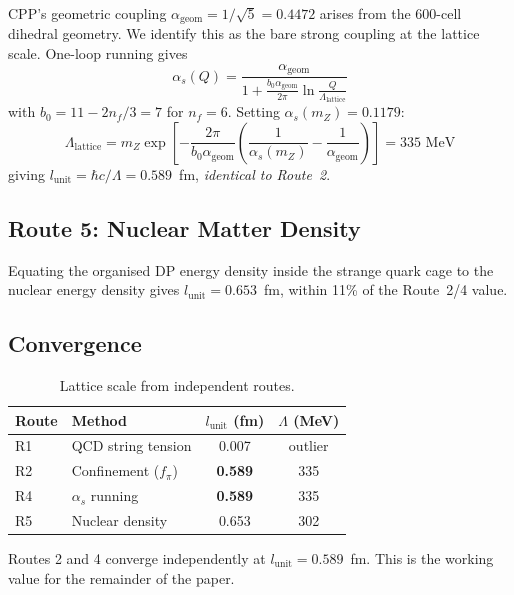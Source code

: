 \documentclass[12pt,a4paper]{article}
\begin{document}
CPP's geometric coupling $\alpha_{\mathrm{geom}} = 1/\sqrt{5} = 0.4472$ arises from the 600-cell dihedral geometry. We identify this as the bare strong coupling at the lattice scale. One-loop running gives
\begin{equation}
\alpha_s(Q) = \frac{\alpha_{\mathrm{geom}}}{1 + \frac{b_0 \alpha_{\mathrm{geom}}}{2\pi}\ln\frac{Q}{\Lambda_{\mathrm{lattice}}}}
\label{eq:running}
\end{equation}
with $b_0 = 11 - 2n_f/3 = 7$ for $n_f = 6$. Setting $\alpha_s(m_Z) = 0.1179$:
\begin{equation}
\Lambda_{\mathrm{lattice}} = m_Z \exp\!\left[-\frac{2\pi}{b_0\alpha_{\mathrm{geom}}}\left(\frac{1}{\alpha_s(m_Z)} - \frac{1}{\alpha_{\mathrm{geom}}}\right)\right] = 335 \text{ MeV}
\end{equation}
giving $l_{\mathrm{unit}} = \hbar c / \Lambda = 0.589$~fm, \emph{identical to Route~2}.

\subsection{Route 5: Nuclear Matter Density}

Equating the organised DP energy density inside the strange quark cage to the nuclear energy density gives $l_{\mathrm{unit}} = 0.653$~fm, within 11\% of the Route~2/4 value.

\subsection{Convergence}

\begin{table}[h]
\centering
\caption{Lattice scale from independent routes.}
\label{tab:routes}
\begin{tabular}{llcc}
\toprule
Route & Method & $l_{\mathrm{unit}}$ (fm) & $\Lambda$ (MeV) \\
\midrule
R1 & QCD string tension & 0.007 & outlier \\
R2 & Confinement ($f_\pi$) & \textbf{0.589} & 335 \\
R4 & $\alpha_s$ running & \textbf{0.589} & 335 \\
R5 & Nuclear density & 0.653 & 302 \\
\bottomrule
\end{tabular}
\end{table}

Routes 2 and 4 converge independently at $l_{\mathrm{unit}} = 0.589$~fm. This is the working value for the remainder of the paper.
\end{document}
